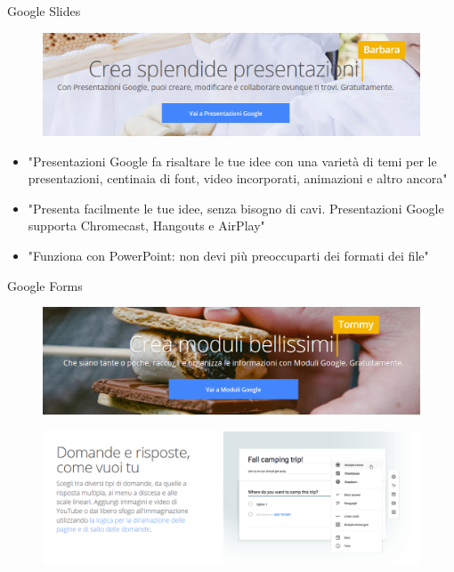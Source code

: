 \documentclass{beamer}
\begin{document}
\begin{frame}{Google Slides}
\begin{figure}[h!]
\includegraphics[height=0.3\textheight]{immagini/slides.png}
\end{figure}
\footnotesize
\begin{itemize}
\item "Presentazioni Google fa risaltare le tue idee con una varietà di temi per le presentazioni, centinaia di font, video incorporati, animazioni e altro ancora"
\item "Presenta facilmente le tue idee, senza bisogno di cavi. Presentazioni Google supporta Chromecast, Hangouts e AirPlay"
\item "Funziona con PowerPoint: non devi più preoccuparti dei formati dei file"
\end{itemize}
\end{frame}
\begin{frame}{Google Forms}
\begin{figure}[h!]
\includegraphics[height=0.3\textheight]{immagini/forms.png}
\end{figure}
\begin{figure}[h!]
\includegraphics[width=\linewidth]{immagini/domande.png}
\end{figure}
\end{frame}
\end{document}
